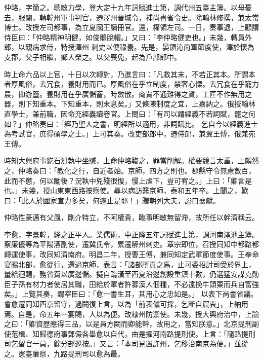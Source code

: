 \begin{pinyinscope}
 仲略，字簡之。聰敏力學，登大定十九年詞賦進士第，調代州五臺主簿。以母憂去，服闋，轉韓州軍事判官，遷澤州晉城令，補尚書省令史。除翰林修撰，兼太常博士。改授左司都事，為立夏國王讀冊官。還，權領左司。一日，奏事退，上顧謂侍臣曰：「仲略精神明健，如俊鶻脫帽。」又曰：「李仲略健吏也。」未幾，轉員外郎，以親病求侍，特授澤州
 刺史以便祿養。先是，晏領沁南軍節度使，澤於懷為支郡，父子相繼，鄉人榮之。以父喪免，起為戶部郎中。



 時上命六品以上官，十日以次轉對，乃進言曰：「凡救其末，不若正其本。所謂本者厚風俗，去冗食，養財用而已。厚風俗在乎立制度，禁奢心慄。去冗食在乎寵力農，抑游墮。養財用在乎廣儲蓄，時斂散。商賈不通難得之貨，工匠不作無用之器，則下知重本。下知重本，則末息矣。」又條陳制度之宜，上嘉納之。俄授翰林直學士，兼前職，因命充經義讀卷官。上問曰：「有司以謂經義不若詞賦，罷之何如？」仲略奏曰：「經乃聖人之書，明經所以適用，非詞賦比。
 乞自今以經義進士為考試官，庶得碩學之士。」上可其奏。改吏部郎中，遷侍郎，兼翼王傅，俄兼宛王傅。



 時知大興府事紇石烈執中坐贓，上命仲略鞫之，罪當削解。權要競言太重，上頗然之，仲略奏曰：「教化之行，自近者始。京師，四方之則也。郡縣守令無慮數百，此而不懲，何以勵後？況執中兇殘很愎，慢上虐下，豈可宥之。」上曰：「卿言是也。」未幾，授山東東西路按察使。尋以病訪醫京師，泰和五年卒。上聞之，歎曰：「此人於國家宣力多矣，何遽止是耶！」贈朝列大夫，謚曰襄獻。



 仲略性豪邁有父風，剛介特立，不阿權貴，臨事明敏無留滯，故所任以幹濟稱云。



 李愈，字景韓，絳之正平人。業儒術，中正隆五年詞賦進士第，調河南澠池主簿。察廉優等為平陽酒副使，遷冀氏令，累遷解州刺史。章宗即位，召授同知中都路都轉運使事，改同知濟南府。明昌二年，授曹王傅，兼同知定武軍節度使事。王奉命宴賜北部，愈從行，還過京師，表言：「諸部所貢之馬，止可委招討司受於界上，量給迴賜，務省費以廣邊儲。擬自臨潢至西夏沿邊創設重鎮十數，仍選猛安謀克勛臣子孫有材力者使居其職，田給於軍者許募漢人佃種，不必遠挽牛頭粟而兵自富強矣。」上覽其奏，謂宰臣曰：「愈一書生耳，其用心之忠如是。」
 以表下尚書省議。會愈遷同知西京留守，過闕復上言，以為「前表儻可採，乞斷自宸衷」，上納用焉。自是，命五年一宴賜，人以為便。改棣州防禦使。未幾，授大興府治中，上諭之曰：「卿資歷應得三品，以是員方闕而卿能幹，故用之，當知朕意。」北京提刑副使范楫、知歸德府事鄧儼各舉愈以自代，由是擢河南路提刑使。上言：「隨路提刑司乞留官一員，餘分部巡按。」又言：「本司見置許州，乞移治南京為便。」並從之。憲臺廉察，九路提刑司以愈為最。




\end{pinyinscope}
